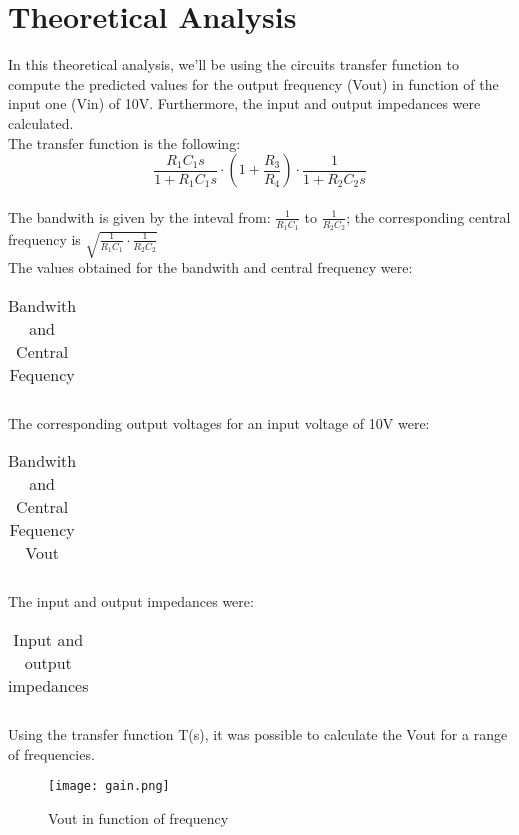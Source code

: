 \section{Theoretical Analysis}
\label{sec:analysis}

In this theoretical analysis, we'll be using the circuits transfer function to compute the predicted values for the output frequency (Vout) in function of the input one (Vin) of 10V. Furthermore, the input and output impedances were calculated.\\
The transfer function is the following: \[\frac{R_1C_1s}{1+R_1C_1s} \cdot (1+\frac{R_3}{R_4}) \cdot \frac{1}{1+R_2C_2s}\] \\
The bandwith is given by the inteval from: $\frac{1}{R_1C_1}$ to $\frac{1}{R_2C_2}$; the corresponding central frequency is $\sqrt{{\frac{1}{R_1C_1} \cdot \frac{1}{R_2C_2}}}$ \\
The values obtained for the bandwith and central frequency were:
\FloatBarrier
\begin{table}[h]
  \centering
  \begin{tabular}{|c|c|}
    \hline    
    
    \hline
  \end{tabular}
  \caption{Bandwith and Central Fequency}
  \label{tab:Octave_cent}
\end{table}
\FloatBarrier

The corresponding output voltages for an input voltage of 10V were:
\FloatBarrier
\begin{table}[h]
  \centering
  \begin{tabular}{|c|c|}
    \hline    
    
    \hline
  \end{tabular}
  \caption{Bandwith and Central Fequency Vout}
  \label{tab:Octave_cent}
\end{table}
\FloatBarrier

The input and output impedances were:
\FloatBarrier
\begin{table}[h]
  \centering
  \begin{tabular}{|c|c|}
    \hline    
    
    \hline
  \end{tabular}
  \caption{Input and output impedances}
  \label{tab:Octave_cent}
\end{table}
\FloatBarrier

Using the transfer function T(s), it was possible to calculate the Vout for a range of frequencies.

\begin{figure} [!htb] 
  \texttt{[image: gain.png]}
  \caption{Vout in function of frequency} 
  \label{fig:theoplots}
  \endminipage\hfill
\end{figure}

\FloatBarrier


